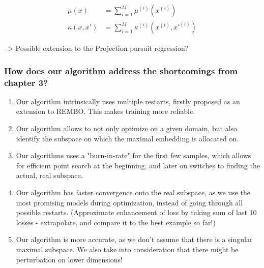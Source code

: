 
\begin{align}
\mu(x) &= \sum_{i=1}^{M} \mu^{(i)} ( x^{(i)} ) \\
\kappa(x, x') &= \sum_{i=1}^{M} \kappa^{(i)} ( x^{(i)}, x'^{(i)}  )
\end{align}


--> Possible extension to the Projection pursuit regression?

\subsubsection{How does our algorithm address the shortcomings from chapter 3?}

\begin{enumerate}
\item Our algorithm intrinsically uses multiple restarts, firstly proposed as an extension to REMBO.
This makes training more reliable.
\item Our algorithm allows to not only optimize on a given domain, but also identify the subspace on which the maximal embedding is allocated on.
\item Our algorithms uses a "burn-in-rate" for the first few samples, which allows for efficient point search at the beginning, and later on switches to finding the actual, real subspace.
\item Our algorithm has faster convergence onto the real subspace, as we use the most promising models during optimization, instead of going through all possible restarts. (Approximate enhancement of loss by taking sum of last 10 losses - extrapolate, and compare it to the best example so far!)
\item Our algorithm is more accurate, as we don't assume that there is a singular maximal subspace. 
We also take into consideration that there might be perturbation on lower dimensions!
\end{enumerate}


